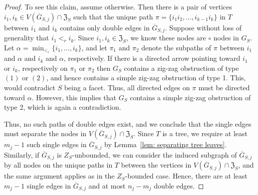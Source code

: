 \documentclass[11pt]{article}
\theoremstyle{definition}
\numberwithin{equation}{section}
\begin{document}
\begin{proof}
To see this claim, assume otherwise.  
Then there is a pair of vertices $i_1,i_k\in V(\overline{G}_{S,j})\cap\mathfrak{Z}_S$ such that the unique path $\pi = \{i_1i_2,\ldots, i_{k-1}i_k\}$ in $T$ between $i_1$ and $i_k$ contains only double edges in $\overline{G}_{S,j}$.  
Suppose without loss of generality that $i_1 <_r i_k$.  
Since $i_1,i_k\in\mathfrak{Z}_S$, we know these nodes are $\circ$ nodes in $G_S$.  
Let $\alpha = \min_{<_r}\{i_1,\ldots, i_k\}$, and let $\pi_1$ and $\pi_2$ denote the subpaths of $\pi$ between $i_1$ and $\alpha$ and $i_k$ and $\alpha$, respectively. 
If there is a directed arrow pointing toward $i_1$ or $i_k$, respectively on $\pi_1$ or $\pi_2$ then $G_S$ contains a zig-zag obstruction of type $(1)$ or $(2)$, and hence contains a simple zig-zag obstruction of type 1.  
This, would contradict $S$ being a facet. 
Thus, all directed edges on $\pi$ must be directed toward $\alpha$.
However, this implies that $G_S$ contains a simple zig-zag obstruction of type 2, which is again a contradiction. 

Thus, no such paths of double edges exist, and we conclude that the single edges must separate the nodes in $V(\overline{G}_{S,j})\cap\mathfrak{Z}_S$.  
Since $T$ is a tree, we require at least $m_j - 1$ such single edges in $\overline{G}_{S,j}$ by Lemma~\ref{lem: separating tree leaves}.  
Similarly, if $\overline{G}_{S,j}$ is $Z_S$-unbounded, we can consider the induced subgraph of $\overline{G}_{S,j}$ by all nodes on the unique paths in $T$ between the vertices in $V(\overline{G}_{S,j})\cap\mathfrak{Z}_S$, and the same argument applies as in the $Z_S$-bounded case. 
Hence, there are at least $m_j-1$ single edges in $\overline{G}_{S,j}$ and at most $n_j - m_j$ double edges.


\end{proof}
\end{document}

